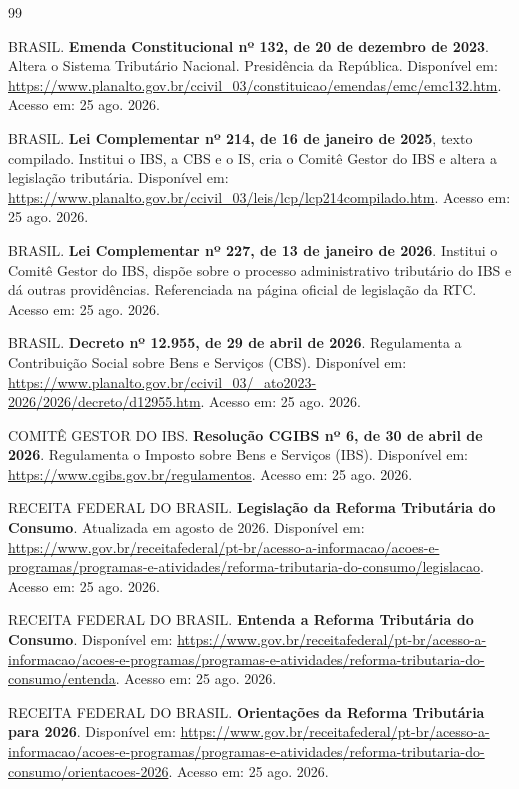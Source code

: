 \documentclass[11pt,a4paper]{article}
\begin{document}
\small
\begin{thebibliography}{99}

BRASIL. \textbf{Emenda Constitucional nº 132, de 20 de dezembro de 2023}. Altera o Sistema Tributário Nacional. Presidência da República. Disponível em: \url{https://www.planalto.gov.br/ccivil_03/constituicao/emendas/emc/emc132.htm}. Acesso em: 25 ago. 2026.

BRASIL. \textbf{Lei Complementar nº 214, de 16 de janeiro de 2025}, texto compilado. Institui o IBS, a CBS e o IS, cria o Comitê Gestor do IBS e altera a legislação tributária. Disponível em: \url{https://www.planalto.gov.br/ccivil_03/leis/lcp/lcp214compilado.htm}. Acesso em: 25 ago. 2026.

BRASIL. \textbf{Lei Complementar nº 227, de 13 de janeiro de 2026}. Institui o Comitê Gestor do IBS, dispõe sobre o processo administrativo tributário do IBS e dá outras providências. Referenciada na página oficial de legislação da RTC. Acesso em: 25 ago. 2026.

BRASIL. \textbf{Decreto nº 12.955, de 29 de abril de 2026}. Regulamenta a Contribuição Social sobre Bens e Serviços (CBS). Disponível em: \url{https://www.planalto.gov.br/ccivil_03/_ato2023-2026/2026/decreto/d12955.htm}. Acesso em: 25 ago. 2026.

COMITÊ GESTOR DO IBS. \textbf{Resolução CGIBS nº 6, de 30 de abril de 2026}. Regulamenta o Imposto sobre Bens e Serviços (IBS). Disponível em: \url{https://www.cgibs.gov.br/regulamentos}. Acesso em: 25 ago. 2026.

RECEITA FEDERAL DO BRASIL. \textbf{Legislação da Reforma Tributária do Consumo}. Atualizada em agosto de 2026. Disponível em: \url{https://www.gov.br/receitafederal/pt-br/acesso-a-informacao/acoes-e-programas/programas-e-atividades/reforma-tributaria-do-consumo/legislacao}. Acesso em: 25 ago. 2026.

RECEITA FEDERAL DO BRASIL. \textbf{Entenda a Reforma Tributária do Consumo}. Disponível em: \url{https://www.gov.br/receitafederal/pt-br/acesso-a-informacao/acoes-e-programas/programas-e-atividades/reforma-tributaria-do-consumo/entenda}. Acesso em: 25 ago. 2026.

RECEITA FEDERAL DO BRASIL. \textbf{Orientações da Reforma Tributária para 2026}. Disponível em: \url{https://www.gov.br/receitafederal/pt-br/acesso-a-informacao/acoes-e-programas/programas-e-atividades/reforma-tributaria-do-consumo/orientacoes-2026}. Acesso em: 25 ago. 2026.


\end{thebibliography}
\end{document}
